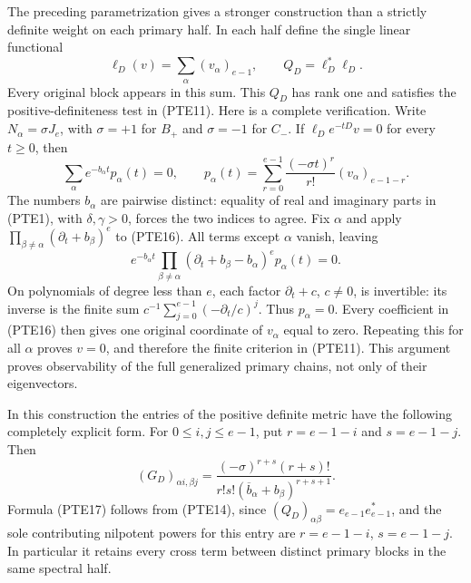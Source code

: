 The preceding parametrization gives a stronger construction than a
strictly definite weight on each primary half.  In each half define
the single linear functional
\begin{equation}\tag{PTE15}\label{eq:pte15}
 \ell_D(v)=\sum_{\alpha}(v_\alpha)_{e-1},
 \qquad Q_D=\ell_D^*\ell_D.
\end{equation}
Every original block appears in this sum.  This \(Q_D\) has rank one
and satisfies the positive-definiteness test in (PTE11).  Here is a
complete verification.  Write \(N_\alpha=\sigma J_e\), with
\(\sigma=+1\) for \(B_+\) and \(\sigma=-1\) for \(C_-\).  If
\(\ell_De^{-tD}v=0\) for every \(t\geq0\), then
\begin{equation}\tag{PTE16}\label{eq:pte16}
 \sum_\alpha e^{-b_\alpha t}p_\alpha(t)=0,
 \qquad
 p_\alpha(t)=\sum_{r=0}^{e-1}
 \frac{(-\sigma t)^r}{r!}(v_\alpha)_{e-1-r}.
\end{equation}
The numbers \(b_\alpha\) are pairwise distinct: equality of real and
imaginary parts in (PTE1), with \(\delta,\gamma>0\), forces the two
indices to agree.  Fix \(\alpha\) and apply
\(\prod_{\beta\ne\alpha}(\partial_t+b_\beta)^e\) to (PTE16).
All terms except \(\alpha\) vanish, leaving
\[
 e^{-b_\alpha t}
 \prod_{\beta\ne\alpha}(\partial_t+b_\beta-b_\alpha)^e
 p_\alpha(t)=0.
\]
On polynomials of degree less than \(e\), each factor
\(\partial_t+c\), \(c\ne0\), is invertible: its inverse is the finite
sum \(c^{-1}\sum_{j=0}^{e-1}(-\partial_t/c)^j\).
Thus \(p_\alpha=0\).  Every coefficient in (PTE16) then gives one
original coordinate of \(v_\alpha\) equal to zero.  Repeating this for
all \(\alpha\) proves \(v=0\), and therefore the finite criterion in
(PTE11).  This argument proves observability of the full generalized
primary chains, not only of their eigenvectors.

In this construction the entries of the positive definite metric
have the following completely explicit form.  For
\(0\leq i,j\leq e-1\), put \(r=e-1-i\) and \(s=e-1-j\).  Then
\begin{equation}\tag{PTE17}\label{eq:pte17}
 (G_D)_{\alpha i,\beta j}
 =\frac{(-\sigma)^{r+s}(r+s)!}
 {r!s!(\overline b_\alpha+b_\beta)^{r+s+1}}.
\end{equation}
Formula (PTE17) follows from (PTE14), since
\((Q_D)_{\alpha\beta}=e_{e-1}e_{e-1}^*\), and the sole contributing
nilpotent powers for this entry are \(r=e-1-i\), \(s=e-1-j\).
In particular it retains every cross term between distinct primary
blocks in the same spectral half.

